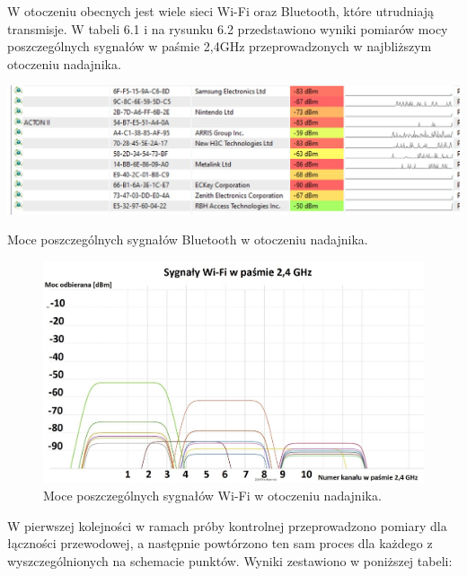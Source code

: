 \documentclass[12pt, twoside, openany]{mwrep}
\begin{document}
W otoczeniu obecnych jest wiele sieci Wi-Fi oraz Bluetooth, które utrudniają transmisje. W tabeli 6.1 i na rysunku 6.2 przedstawiono wyniki pomiarów mocy poszczególnych sygnałów w paśmie 2,4GHz przeprowadzonych w najbliższym otoczeniu nadajnika.
\begin{table}[H]
\centering
\includegraphics[scale=0.4]{bt}
\caption{Moce poszczególnych sygnałów Bluetooth w otoczeniu nadajnika.}
\end{table}
\begin{figure}[H]
\centering
\includegraphics[scale=0.35]{2,4Ghz}
\caption{Moce poszczególnych sygnałów Wi-Fi w otoczeniu nadajnika.}
\end{figure}
W pierwszej kolejności w ramach próby kontrolnej przeprowadzono pomiary dla łączności przewodowej, a następnie powtórzono ten sam proces dla każdego z wyszczególnionych na schemacie punktów. Wyniki zestawiono w poniższej tabeli:
\end{document}
